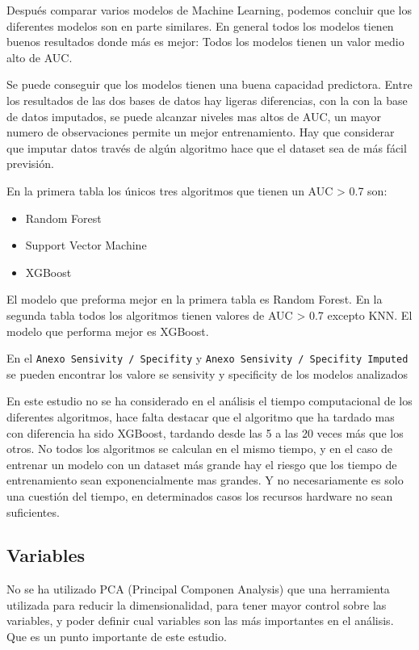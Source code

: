 \documentclass[
]{article}
\begin{document}
Después comparar varios modelos de Machine Learning, podemos concluir
que los diferentes modelos son en parte similares. En general todos los
modelos tienen buenos resultados donde más es mejor: Todos los modelos
tienen un valor medio alto de AUC.

Se puede conseguir que los modelos tienen una buena capacidad
predictora. Entre los resultados de las dos bases de datos hay ligeras
diferencias, con la con la base de datos imputados, se puede alcanzar
niveles mas altos de AUC, un mayor numero de observaciones permite un
mejor entrenamiento. Hay que considerar que imputar datos través de
algún algoritmo hace que el dataset sea de más fácil previsión.

En la primera tabla los únicos tres algoritmos que tienen un AUC
\textgreater{} 0.7 son:

\begin{itemize}
\item
  Random Forest
\item
  Support Vector Machine
\item
  XGBoost
\end{itemize}

El modelo que preforma mejor en la primera tabla es Random Forest. En la
segunda tabla todos los algoritmos tienen valores de AUC \textgreater{}
0.7 excepto KNN. El modelo que performa mejor es XGBoost.

En el \texttt{Anexo\ Sensivity\ /\ Specifity} y
\texttt{Anexo\ Sensivity\ /\ Specifity\ Imputed} se pueden encontrar los
valore se sensivity y specificity de los modelos analizados

En este estudio no se ha considerado en el análisis el tiempo
computacional de los diferentes algoritmos, hace falta destacar que el
algoritmo que ha tardado mas con diferencia ha sido XGBoost, tardando
desde las 5 a las 20 veces más que los otros. No todos los algoritmos se
calculan en el mismo tiempo, y en el caso de entrenar un modelo con un
dataset más grande hay el riesgo que los tiempo de entrenamiento sean
exponencialmente mas grandes. Y no necesariamente es solo una cuestión
del tiempo, en determinados casos los recursos hardware no sean
suficientes.

\hypertarget{variables}{%
\subsection{Variables}\label{variables}}

No se ha utilizado PCA (Principal Componen Analysis) que una herramienta
utilizada para reducir la dimensionalidad, para tener mayor control
sobre las variables, y poder definir cual variables son las más
importantes en el análisis. Que es un punto importante de este estudio.
\end{document}
